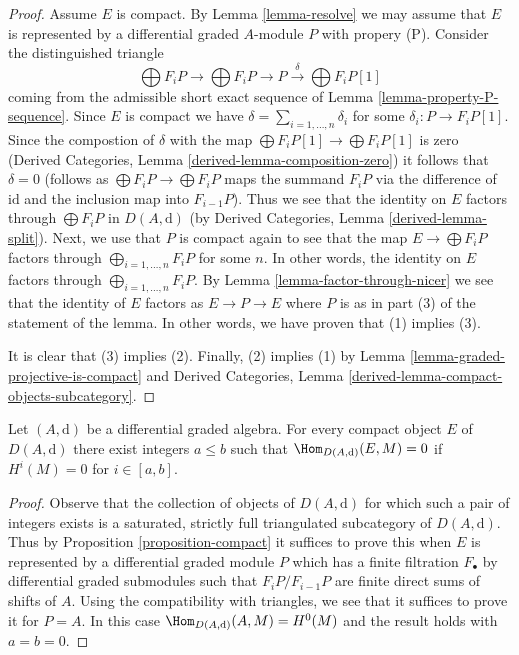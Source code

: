 \begin{proof}
Assume $E$ is compact. By Lemma \ref{lemma-resolve} we may assume that $E$
is represented by a differential graded $A$-module $P$ with propery (P).
Consider the distinguished triangle
$$
\bigoplus F_iP \to \bigoplus F_iP \to P
\xrightarrow{\delta} \bigoplus F_iP[1]
$$
coming from the admissible short exact sequence of
Lemma \ref{lemma-property-P-sequence}. Since $E$ is compact we have
$\delta = \sum_{i = 1, \ldots, n} \delta_i$ for some
$\delta_i : P \to F_iP[1]$. Since the compostion of $\delta$
with the map $\bigoplus F_iP[1] \to \bigoplus F_iP[1]$ is zero
(Derived Categories, Lemma \ref{derived-lemma-composition-zero})
it follows that $\delta = 0$ (follows as $\bigoplus F_iP \to \bigoplus F_iP$
maps the summand $F_iP$ via the difference of $\text{id}$ and the inclusion
map into $F_{i - 1}P$).
Thus we see that the identity on $E$ factors through
$\bigoplus F_iP$ in $D(A, \text{d})$ (by
Derived Categories, Lemma \ref{derived-lemma-split}).
Next, we use that $P$ is compact again to see that the map
$E \to \bigoplus F_iP$ factors through $\bigoplus_{i = 1, \ldots, n} F_iP$
for some $n$. In other words, the identity on $E$ factors through
$\bigoplus_{i = 1, \ldots, n} F_iP$. By
Lemma \ref{lemma-factor-through-nicer}
we see that the identity of $E$ factors as $E \to P \to E$
where $P$ is as in part (3) of the statement of the lemma.
In other words, we have proven that (1) implies (3).

\medskip\noindent
It is clear that (3) implies (2). Finally, (2) implies (1) by
Lemma \ref{lemma-graded-projective-is-compact}
and
Derived Categories, Lemma \ref{derived-lemma-compact-objects-subcategory}.
\end{proof}

\begin{lemma}
\label{lemma-compact-implies-bounded}
Let $(A, \text{d})$ be a differential graded algebra.
For every compact object $E$ of $D(A, \text{d})$ there
exist integers $a \leq b$ such that $\Hom_{D(A, \text{d})}(E, M) = 0$
if $H^i(M) = 0$ for $i \in [a, b]$.
\end{lemma}

\begin{proof}
Observe that the collection of objects of $D(A, \text{d})$ for which
such a pair of integers exists is a saturated, strictly full triangulated
subcategory of $D(A, \text{d})$.
Thus by Proposition \ref{proposition-compact} it suffices to prove
this when $E$ is represented by a differential graded module $P$ which
has a finite filtration $F_\bullet$ by differential graded submodules
such that $F_iP/F_{i - 1}P$ are finite direct sums of shifts of $A$.
Using the compatibility with triangles, we see that it suffices
to prove it for $P = A$. In this case $\Hom_{D(A, \text{d})}(A, M) = H^0(M)$
and the result holds with $a = b = 0$.
\end{proof}

